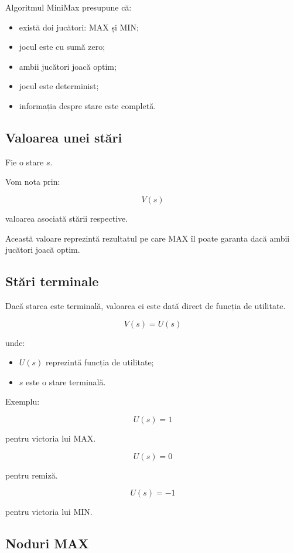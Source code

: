 \documentclass[12pt,a4paper]{article}
\begin{document}
Algoritmul MiniMax presupune că:

\begin{itemize}
\item există doi jucători: MAX și MIN;
\item jocul este cu sumă zero;
\item ambii jucători joacă optim;
\item jocul este determinist;
\item informația despre stare este completă.
\end{itemize}

\subsection{Valoarea unei stări}

Fie o stare $s$.

Vom nota prin:

\[
V(s)
\]

valoarea asociată stării respective.

Această valoare reprezintă rezultatul pe care MAX îl poate garanta dacă ambii jucători joacă optim.

\subsection{Stări terminale}

Dacă starea este terminală, valoarea ei este dată direct de funcția de utilitate.

\[
V(s)=U(s)
\]

unde:

\begin{itemize}
\item $U(s)$ reprezintă funcția de utilitate;
\item $s$ este o stare terminală.
\end{itemize}

Exemplu:

\[
U(s)=1
\]

pentru victoria lui MAX.

\[
U(s)=0
\]

pentru remiză.

\[
U(s)=-1
\]

pentru victoria lui MIN.

\subsection{Noduri MAX}
\end{document}
